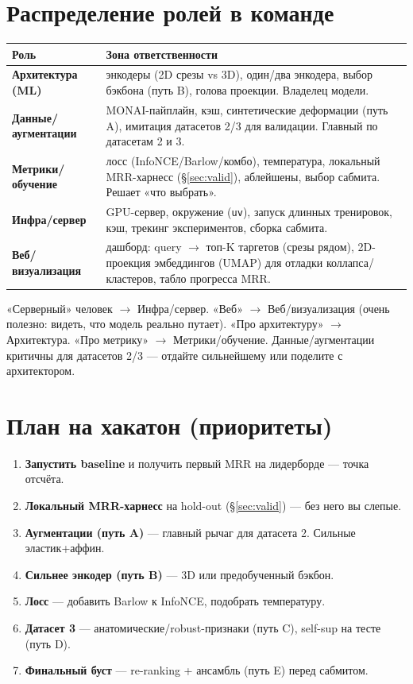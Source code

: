 \documentclass[11pt,a4paper]{article}
\begin{document}
\section{Распределение ролей в команде}

\begin{center}\small
\begin{tabularx}{\linewidth}{@{}l X@{}}\toprule
\textbf{Роль} & \textbf{Зона ответственности}\\\midrule
\textbf{Архитектура (ML)} & энкодеры (2D срезы vs 3D), один/два энкодера, выбор бэкбона (путь B), голова проекции. Владелец модели.\\
\textbf{Данные/аугментации} & MONAI-пайплайн, кэш, синтетические деформации (путь A), имитация датасетов 2/3 для валидации. Главный по датасетам 2 и 3.\\
\textbf{Метрики/обучение} & лосс (InfoNCE/Barlow/комбо), температура, локальный MRR-харнесс (§\ref{sec:valid}), аблейшены, выбор сабмита. Решает «что выбрать».\\
\textbf{Инфра/сервер} & GPU-сервер, окружение (\texttt{uv}), запуск длинных тренировок, кэш, трекинг экспериментов, сборка сабмита.\\
\textbf{Веб/визуализация} & дашборд: query $\to$ топ-K таргетов (срезы рядом), 2D-проекция эмбеддингов (UMAP) для отладки коллапса/кластеров, табло прогресса MRR.\\
\bottomrule\end{tabularx}\end{center}

\begin{note}
«Серверный» человек $\to$ Инфра/сервер. «Веб» $\to$ Веб/визуализация (очень полезно: видеть, что
модель реально путает). «Про архитектуру» $\to$ Архитектура. «Про метрику» $\to$ Метрики/обучение.
Данные/аугментации критичны для датасетов 2/3 — отдайте сильнейшему или поделите с архитектором.
\end{note}

\section{План на хакатон (приоритеты)}

\begin{enumerate}
\item \textbf{Запустить baseline} и получить первый MRR на лидерборде — точка отсчёта.
\item \textbf{Локальный MRR-харнесс} на hold-out (§\ref{sec:valid}) — без него вы слепые.
\item \textbf{Аугментации (путь A)} — главный рычаг для датасета 2. Сильные эластик+аффин.
\item \textbf{Сильнее энкодер (путь B)} — 3D или предобученный бэкбон.
\item \textbf{Лосс} — добавить Barlow к InfoNCE, подобрать температуру.
\item \textbf{Датасет 3} — анатомические/robust-признаки (путь C), self-sup на тесте (путь D).
\item \textbf{Финальный буст} — re-ranking + ансамбль (путь E) перед сабмитом.
\end{enumerate}
\end{document}
